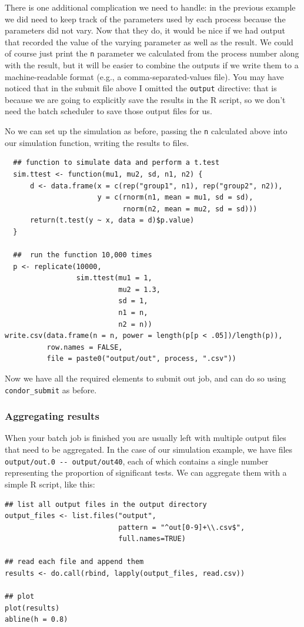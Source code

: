 \documentclass[11pt]{article}
\begin{document}
There is one additional complication we need to handle: in the previous example we did need to keep track of the parameters used by each process because the parameters did not vary. Now that they do, it would be nice if we had output that recorded the value of the varying parameter as well as the result. We could of course just print the \texttt{n} parameter we calculated from the process number along with the result, but it will be easier to combine the outputs if we write them to a machine-readable format (e.g., a comma-separated-values file). You may have noticed that in the submit file above I omitted the \texttt{output} directive: that is because we are going to explicitly save the results in the R script, so we don't need the batch scheduler to save those output files for us.

No we can set up the simulation as before, passing the \texttt{n} calculated above into our simulation function, writing the results to files. 
\begin{verbatim}
  ## function to simulate data and perform a t.test
  sim.ttest <- function(mu1, mu2, sd, n1, n2) {
      d <- data.frame(x = c(rep("group1", n1), rep("group2", n2)),
                      y = c(rnorm(n1, mean = mu1, sd = sd),
                            rnorm(n2, mean = mu2, sd = sd)))
      return(t.test(y ~ x, data = d)$p.value)
  }

  ##  run the function 10,000 times 
  p <- replicate(10000,
                 sim.ttest(mu1 = 1,
                           mu2 = 1.3,
                           sd = 1,
                           n1 = n,
                           n2 = n))
write.csv(data.frame(n = n, power = length(p[p < .05])/length(p)),
          row.names = FALSE,
          file = paste0("output/out", process, ".csv"))
\end{verbatim}

Now we have all the required elements to submit out job, and can do so using \texttt{condor\_submit} as before. 

\subsubsection{Aggregating results}
\label{sec-7-4-3}
When your batch job is finished you are usually left with multiple output files that need to be aggregated. In the case of our simulation example, we have files \texttt{output/out.0 -{}- output/out40}, each of which contains a single number representing the proportion of significant tests. We can aggregate them with a simple R script, like this:
\begin{verbatim}
## list all output files in the output directory
output_files <- list.files("output",
                           pattern = "^out[0-9]+\\.csv$",
                           full.names=TRUE)

## read each file and append them
results <- do.call(rbind, lapply(output_files, read.csv))

## plot
plot(results)
abline(h = 0.8)
\end{verbatim}
\end{document}
